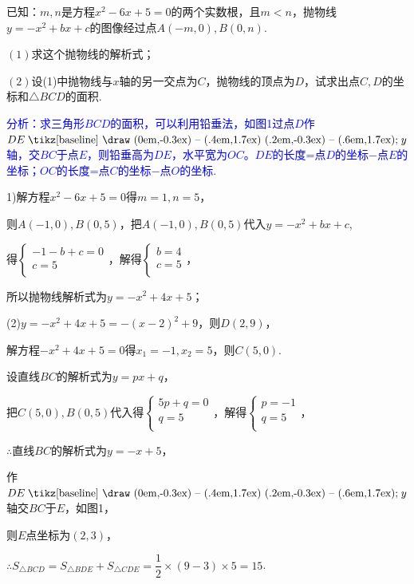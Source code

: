 \documentclass[10pt]{ctexart}
\newcommand{\jd}[1]{\noindent {\kaishu \textbf{解:}#1}}
\newcommand\pxx{%
		\mathrel{\text{\tikz[baseline] \draw (0em,-0.3ex) -- (.4em,1.7ex) (.2em,-0.3ex) -- (.6em,1.7ex);}%
	}}
\begin{document}
\begin{shaded}
\begin{example}
已知：$m,n$是方程$x^2-6x+5=0$的两个实数根，且$m<n$，抛物线$y=-x^2+bx+c$的图像经过点$A(-m,0),B(0,n)$.

$(1)$求这个抛物线的解析式；

$(2)$设(1)中抛物线与$x$轴的另一交点为$C$，抛物线的顶点为$D$，试求出点$C,D$的坐标和$\triangle BCD$的面积.
\end{example}
\end{shaded}
{\kaishu \textcolor{blue} {分析：求三角形$BCD$的面积，可以利用铅垂法，如图1过点$D$作$DE \pxx y$轴，交$BC$于点$E$，则铅垂高为$DE$，水平宽为$OC$。$DE$的长度=点$D$的坐标$-$点$E$的坐标；$OC$的长度=点$C$的坐标$-$点$O$的坐标.}}
\begin{minipage}[t]{0.6\textwidth}
\vspace{-4cm}
\jd (1)解方程$x^2-6x+5=0$得$m=1,n=5$，

则$A(-1,0),B(0,5)$，把$A(-1,0),B(0,5)$代入$y=-x^2+bx+c$,

得$\begin{cases}
-1-b+c=0 \\
c=5 \\
\end{cases}$，解得$\begin{cases}
b=4 \\
c=5 \\
\end{cases}$，

所以抛物线解析式为$y=-x^2+4x+5$；

(2)$y=-x^2+4x+5=-(x-2)^2+9$，则$D(2,9)$，

解方程$-x^2+4x+5=0$得$x_1=-1,x_2=5$，则$C(5,0)$.

设直线$BC$的解析式为$y=px+q$，

把$C(5,0),B(0,5)$代入得$\begin{cases}
5p+q=0 \\
q=5 \\
\end{cases}$，解得$\begin{cases}
p=-1 \\
q=5 \\
\end{cases}$，

$\therefore$直线$BC$的解析式为$y=-x+5$，

作$DE \pxx y$轴交$BC$于$E$，如图1，

则$E$点坐标为$(2,3)$，

$\therefore S_{\triangle BCD}=S_{\triangle BDE}+S_{\triangle CDE}=\dfrac{1}{2}\times (9-3)\times 5=15$.

\end{minipage}
\end{document}
